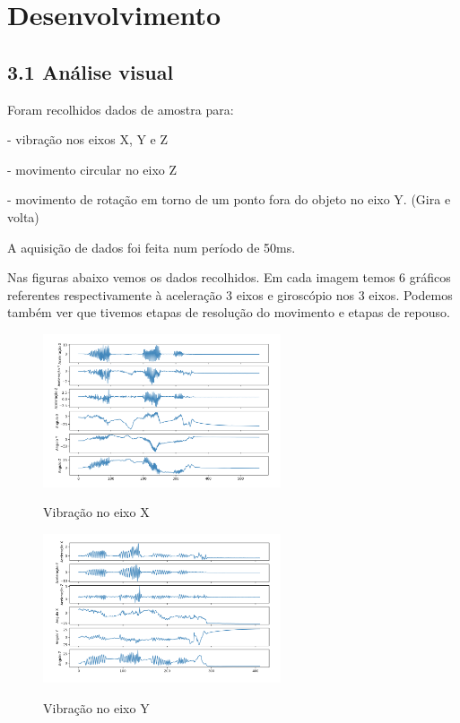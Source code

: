 \section{Desenvolvimento}

\subsection*{3.1 Análise visual}

Foram recolhidos dados de amostra para:

- vibração nos eixos X, Y e Z

- movimento circular no eixo Z

- movimento de rotação em torno de um ponto fora do objeto no eixo Y. (Gira e volta)

A aquisição de dados foi feita num período de 50ms.

Nas figuras abaixo vemos os dados recolhidos. Em cada imagem temos 6 gráficos referentes respectivamente à aceleração 3 eixos e giroscópio nos 3 eixos.
Podemos também ver que tivemos etapas de resolução do movimento e etapas de repouso.


\begin{figure}[H]
    \center
    \includegraphics[width=7cm]{images/VibracaoX.png}
    \label{img6}
    \caption{Vibração no eixo X}
\end{figure}

\begin{figure}[H]
    \center
    \includegraphics[width=7cm]{images/VibracaoY.png}
    \label{img2}
    \caption{Vibração no eixo Y}
\end{figure}

